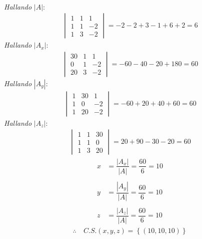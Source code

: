 \documentclass[11pt, a4paper]{article}
\begin{document}
\begin{multicols}{2}
  \\
  \textit{Hallando} $|A|$:
  \begin{align*}
    \begin{vmatrix}
      1 & 1 & 1\\
      1 & 1 & -2\\
      1 & 3 & -2
    \end{vmatrix} = -2-2+3-1+6+2 = 6
  \end{align*}
  \textit{Hallando} $|A_x|$:
  \begin{align*}
    \begin{vmatrix}
      30 & 1 & 1\\
      0 & 1 & -2\\
      20 & 3 & -2
    \end{vmatrix} = -60-40-20+180 = 60
  \end{align*}
  \textit{Hallando} $|A_y|$:
  \begin{align*}
    \begin{vmatrix}
      1 & 30 & 1\\
      1 & 0 & -2\\
      1 & 20 & -2
    \end{vmatrix} = -60+20+40+60 = 60
  \end{align*}
  \textit{Hallando} $|A_z|$:
  \begin{align*}
    \begin{vmatrix}
      1 & 1 & 30\\
      1 & 1 & 0\\
      1 & 3 & 20
    \end{vmatrix} = 20+90-30-20 = 60
  \end{align*}
  \begin{align*}
    x &= \dfrac{|A_x|}{|A|} = \dfrac{60}{6} = 10\\\\
    y &= \dfrac{|A_y|}{|A|} = \dfrac{60}{6} = 10\\\\
    z &= \dfrac{|A_z|}{|A|} = \dfrac{60}{6} = 10
  \end{align*}
  \begin{align*}
    \therefore \ &C.S. \left(x,y,z\right) = \left\{\left(10,10,10\right)\right\}
  \end{align*}
  \columnseprule=1pt
\end{multicols}
\end{document}

